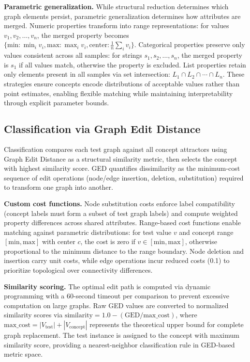 \documentclass[a4paper,10pt]{article}
\begin{document}
\textbf{Parametric generalization.} While structural reduction determines which graph elements persist, parametric generalization determines how attributes are merged. Numeric properties transform into range representations: for values $v_1, v_2, \ldots, v_n$, the merged property becomes $\{\text{min}: \min_i v_i, \text{max}: \max_i v_i, \text{center}: \frac{1}{n}\sum_i v_i\}$. Categorical properties preserve only values consistent across all samples: for strings $s_1, s_2, \ldots, s_n$, the merged property is $s_1$ if all values match, otherwise the property is excluded. List properties retain only elements present in all samples via set intersection: $L_1 \cap L_2 \cap \cdots \cap L_n$. These strategies ensure concepts encode distributions of acceptable values rather than point estimates, enabling flexible matching while maintaining interpretability through explicit parameter bounds.

\subsection{Classification via Graph Edit Distance}

Classification compares each test graph against all concept attractors using Graph Edit Distance as a structural similarity metric, then selects the concept with highest similarity score. GED quantifies dissimilarity as the minimum-cost sequence of edit operations (node/edge insertion, deletion, substitution) required to transform one graph into another.

\textbf{Custom cost functions.} Node substitution costs enforce label compatibility (concept labels must form a subset of test graph labels) and compute weighted property differences across shared attributes. Range-based cost functions enable matching against parametric distributions: for test value $v$ and concept range $[\text{min}, \text{max}]$ with center $c$, the cost is zero if $v \in [\text{min}, \text{max}]$, otherwise proportional to the minimum distance to the range boundary. Node deletion and insertion carry unit costs, while edge operations incur reduced costs (0.1) to prioritize topological over connectivity differences.

\textbf{Similarity scoring.} The optimal edit path is computed via dynamic programming with a 60-second timeout per comparison to prevent excessive computation on large graphs. Raw GED values are converted to normalized similarity scores via $\text{similarity} = 1.0 - (\text{GED} / \text{max\_cost})$, where $\text{max\_cost} = |V_{\text{test}}| + |V_{\text{concept}}|$ represents the theoretical upper bound for complete graph replacement. The test instance is assigned to the concept with maximum similarity score, providing a nearest-neighbor classification rule in GED-based metric space.
\end{document}
